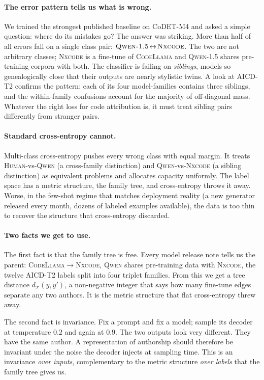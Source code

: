 ﻿\documentclass[11pt]{article}
\begin{document}
\paragraph{The error pattern tells us what is wrong.} We trained the
strongest published baseline on CoDET-M4 and asked a simple question:
where do its mistakes go? The answer was striking. More than half of
all errors fall on a single class pair:
$\textsc{Qwen-1.5}\!\leftrightarrow\!\textsc{Nxcode}$. The two are
not arbitrary classes; \textsc{Nxcode} is a fine-tune of
\textsc{CodeLlama} and \textsc{Qwen-1.5} shares pre-training corpora
with both. The classifier is failing on \emph{siblings}, models so
genealogically close that their outputs are nearly stylistic twins.
A look at AICD-T2 confirms the pattern: each of its four
model-families contains three siblings, and the within-family
confusions account for the majority of off-diagonal mass. Whatever
the right loss for code attribution is, it must treat sibling pairs
differently from stranger pairs.

\paragraph{Standard cross-entropy cannot.} Multi-class cross-entropy
pushes every wrong class with equal margin. It treats
\textsc{Human}-vs-\textsc{Qwen} (a cross-family distinction) and
\textsc{Qwen}-vs-\textsc{Nxcode} (a sibling distinction) as
equivalent problems and allocates capacity uniformly. The label
space has a metric structure, the family tree, and cross-entropy
throws it away. Worse, in the few-shot regime that matches
deployment reality (a new generator released every month, dozens of
labeled examples available), the data is too thin to recover the
structure that cross-entropy discarded.

\paragraph{Two facts we get to use.} The first fact is that the
family tree is free. Every model release note tells us the parent:
\textsc{CodeLlama}$\!\rightarrow\!$\textsc{Nxcode}, \textsc{Qwen}
shares pre-training data with \textsc{Nxcode}, the twelve AICD-T2
labels split into four triplet families. From this we get a tree
distance $d_{\mathcal{T}}(y, y')$, a non-negative integer that says
how many fine-tune edges separate any two authors. It is the metric
structure that flat cross-entropy threw away.

The second fact is invariance. Fix a prompt and fix a model;
sample its decoder at temperature $0.2$ and again at $0.9$. The two
outputs look very different. They have the same author. A
representation of authorship should therefore be invariant under
the noise the decoder injects at sampling time. This is an
invariance \emph{over inputs}, complementary to the metric structure
\emph{over labels} that the family tree gives us.
\end{document}
